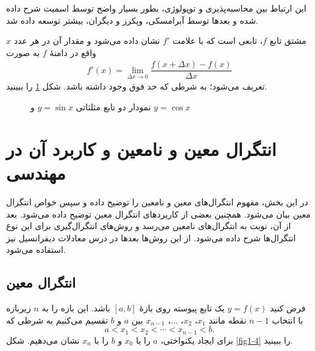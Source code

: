  این ارتباط بین محاسبه‌پذیری و توپولوژی، بطور بسیار واضح توسط اسمیت  شرح داده شده و  بعدها توسط آبرامسکی، ویکرز و دیگران، بیشتر توسعه داده شد.

\begin{pdefinition1}
مشتق تابع $f$، تابعی است که با علامت $f'$ نشان داده می‌شود و مقدار آن در هر عدد $x$ واقع در دامنهٔ $f$
به صورت 
\begin{align}\label{bderi1}
f'(x)=\lim_{\Delta x\rightarrow 0}\dfrac{f(x+\Delta x) - f(x)}{\Delta x}
\end{align}
تعریف می‌شود؛ به شرطی که حد فوق وجود داشته باشد. شکل \ref{fig1-3} را ببینید.
\end{pdefinition1}

\begin{figure}[!h]
\centering
{}
\caption{نمودار دو تابع مثلثاتی $y=\sin x$ و $y=\cos x$}
\label{fig1-3}
\end{figure}

\section{انتگرال معین و نامعین و کاربرد آن در مهندسی}
در این بخش،  مفهوم انتگرال‌های معین و نامعین را توضیح داده
 و سپس خواص انتگرال معین بیان می‌شود. همچنین بعضی از کاربردهای انتگرال
 معین توضیح داده می‌شود. بعد از آن، نوبت به انتگرال‌های نامعین 
می‌رسد و روش‌های انتگرال‌گیری برای این نوع انتگرال‌ها شرح داده می‌شود.
از این روش‌ها بعدها در درس معادلات دیفرانسیل نیز استفاده می‌شود.

\subsection{انتگرال معین}
فرض کنید $y=f(x)$ یک تابع پیوسته روی بازهٔ $[a,b]$ باشد. این بازه را به $n$ زیربازه با انتخاب $n-1$ نقطه مانند $x_1$، $x_2$، $\ldots$، $x_{n-1}$ بین $a$ و $b$ تقسیم می‌کنیم
به شرطی که 
\[
a<x_1<x_2<\cdots<x_{n-1}<b.
\]
برای ایجاد یکنواختی، $a$ را با $x_0$ و $b$ را با $x_n$ نشان می‌دهیم. شکل \ref{fig1-4} را ببینید.




